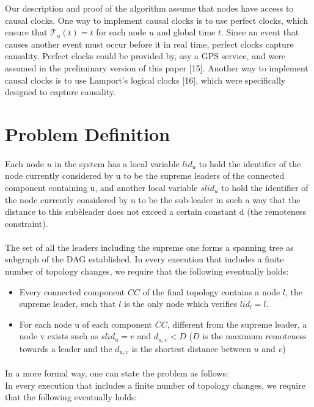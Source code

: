 Our description and proof of the algorithm assume that nodes have access to causal clocks. One way to implement causal clocks is to use perfect clocks, which ensure that $\mathcal{T}_u(t) = t$ for each node $u$ and global time $t$. Since an event that causes another event must occur before it in real time, perfect clocks capture causality. Perfect clocks could be provided by, say a GPS service, and were assumed in the preliminary version of this paper [15]. Another way to implement causal clocks is to use Lamport’s logical clocks [16], which were specifically designed to capture causality.
\newpage
\section{Problem Definition}
\paragraph{}Each node $u$ in the system has a local variable $lid_{u}$ to hold the identifier of the node currently considered by u to be the supreme leaders of the connected component containing u, and another local variable $slid_u$ to hold the identifier of the node currently considered by u to be the sub-leader in such a way that the distance to this subèleader does not exceed a certain constant d (the remoteness constraint).
\paragraph{}The set of all the leaders including the supreme one forms a spanning tree as subgraph of the DAG established.
In every execution that includes a finite number of topology changes, we require that the following eventually holds:
\begin{itemize}
	\item Every connected component $CC$ of the final topology contains a node $l$, the supreme leader, such that $l$ is the only node which verifies $ lid_{l} = l $.
	\item For each node u of each component $CC$, different from the supreme leader, a node v exists such as $slid_{u} = v$ and $d_{u,v} < D$ ($D$ is the maximum remoteness towards a leader and the $ d_{u,v} $ is the shortest distance between $u$ and $v$)
\end{itemize}

\paragraph{}In a more formal way, one can state the problem as follows:\\
In every execution that includes a finite number of topology changes, we require that the following eventually holds:

